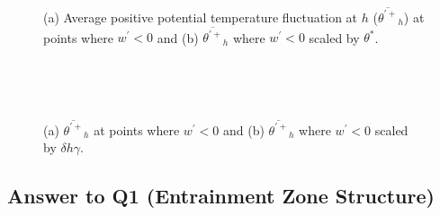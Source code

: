 \begin{figure}[htbp]
\begin{minipage}[b]{0.5\linewidth}
        \\
        \end{minipage}             
\quad
\begin{minipage}[b]{0.5\linewidth}
        \\      
       \end{minipage}
        \caption[Positive potential temperature fluctuation at $h$ (i)]{(a) Average positive potential temperature fluctuation at $h$ ($\overline{\theta^{\prime+}}_{h}$) at points where $w^{\prime}<0$ and (b) $\overline{\theta^{\prime+}}_{h}$ where $w^{\prime}<0$ scaled by $\theta^{*}$.}
        \label{fig:downwarm_theta}
\end{figure}


\begin{figure}[htbp]
\begin{minipage}[b]{0.5\linewidth}
        \\
        \end{minipage}             
\quad
\begin{minipage}[b]{0.5\linewidth}
        \\      
       \end{minipage}
        \caption[Positive potential temperature fluctuation at $h$ (ii)]{(a) $\overline{\theta^{\prime+}}_{h}$ at points where $w^{\prime}<0$ and (b) $\overline{\theta^{\prime+}}_{h}$ where $w^{\prime}<0$ scaled by $\delta h \gamma$.}
        \label{fig:downwarm_theta1}
\end{figure}
\clearpage
\subsection{Answer to Q1 (Entrainment Zone Structure)}

